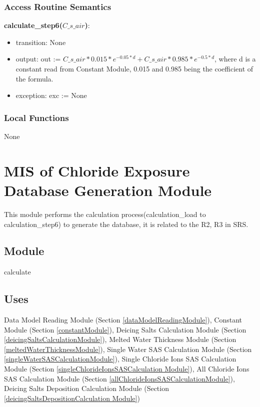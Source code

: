 \documentclass[12pt, titlepage]{article}
\begin{document}
\subsubsection{Access Routine Semantics}

\noindent \textbf{calculate\_step6($C\_s\_air$)}:
\begin{itemize}
\item transition: None
\item output: out := $C\_s\_air * 0.015 * e^{-0.05*d}  + C\_s\_air*0.985 * e^{-0.5*d}$, where d is a constant read from Constant Module, 0.015 and 0.985 being the coefficient of the formula.
\item exception: exc := None
\end{itemize}

\subsubsection{Local Functions}
None
\newpage

\section{MIS of Chloride Exposure Database Generation Module} \label{calculationResultModule}
This module performs the calculation process(calculation\_load to calculation\_step6) to generate the database, it is related to the R2, R3 in SRS.


\subsection{Module}

calculate

\subsection{Uses}

Data Model Reading Module (Section \ref{dataModelReadingModule}), 
Constant Module (Section \ref{constantModule}), Deicing Salts Calculation Module (Section \ref{deicingSaltsCalculationModule}), Melted Water Thickness Module (Section \ref{meltedWaterThicknessModule}), Single Water SAS Calculation Module (Section \ref{singleWaterSASCalculationModule}), Single Chloride Ions SAS Calculation Module (Section \ref{singleChlorideIonsSASCalculation Module}), All Chloride Ions SAS Calculation Module (Section \ref{allChlorideIonsSASCalculationModule}), Deicing Salts Deposition Calculation Module (Section \ref{deicingSaltsDepositionCalculation Module})
\end{document}

